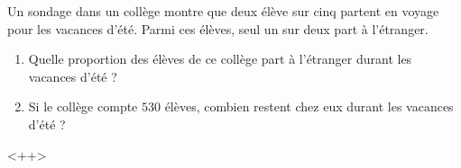 
\begin{exercice}\label{exo2smath-0095}

    Un sondage dans un collège montre que deux élève sur cinq partent en voyage pour les vacances d'été. Parmi ces élèves, seul un sur deux part à l'étranger.
    \begin{enumerate}
        \item
    Quelle proportion des élèves de ce collège part à l'étranger durant les vacances d'été ?
\item
    Si le collège compte \( 530\) élèves, combien restent chez eux durant les vacances d'été ?
    \end{enumerate}
    <++>

\end{exercice}
